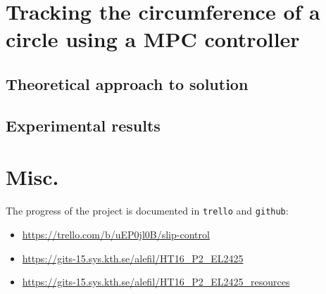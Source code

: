 \documentclass[a4paper,12pt,oneside,onecolumn]{article} %
\begin{document}
  \section{Tracking the circumference of a circle using a MPC controller}

    \subsection{Theoretical approach to solution}
      

    \subsection{Experimental results}
      



\section{Misc.}

The progress of the project is documented in \texttt{trello} and \texttt{github}:

\begin{itemize}
  \item \url{https://trello.com/b/uEP0jl0B/slip-control}
  \item \url{https://gits-15.sys.kth.se/alefil/HT16_P2_EL2425}
  \item \url{https://gits-15.sys.kth.se/alefil/HT16_P2_EL2425_resources}
\end{itemize}
\end{document}
